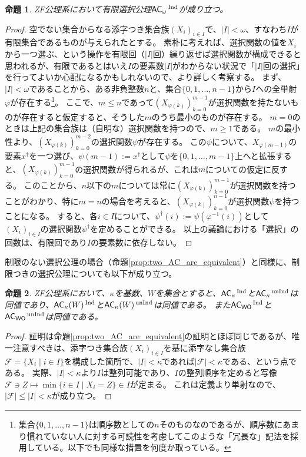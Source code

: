 \documentclass{jarticle}
\newtheorem{proposition}{命題}
\newcommand{\WithIndex}[1]{$\textrm{#1}{}^{\,\textrm{\scriptsize Ind}}$}
\newcommand{\WithoutIndex}[1]{$\textrm{#1}{}^{\,\textrm{\scriptsize unInd}}$}
\begin{document}
\begin{proposition}
\label{prop:finite-AC}
ZF公理系において有限選択公理\WithIndex{$\mathsf{AC}_{\omega}$}が成り立つ。
\end{proposition}
\begin{proof}
空でない集合からなる添字つき集合族$(X_i)_{i \in I}$で、$|I| < \omega$、すなわち$I$が有限集合であるものが与えられたとする。
素朴に考えれば、選択関数の値を$X_i$から一つ選ぶ、という操作を有限回（$|I|$回）繰り返せば選択関数が構成できると思われるが、有限であるとはいえ$I$の要素数$|I|$がわからない状況で「$|I|$回の選択」を行ってよいか心配になるかもしれないので、より詳しく考察する。
まず、$|I| < \omega$であることから、ある非負整数$n$と、集合$\{0,1,\dots,n-1\}$から$I$への全単射$\varphi$が存在する\footnote{集合$\{0,1,\dots,n-1\}$は順序数としての$n$そのものなのであるが、順序数にあまり慣れていない人に対する可読性を考慮してこのような「冗長な」記法を採用している。以下でも同様な措置を何度か取っている。}。
ここで、$m \leq n$であって$(X_{\varphi(k)})_{k=0}^{m-1}$が選択関数を持たないものが存在すると仮定すると、そうした$m$のうち最小のものが存在する。
$m = 0$のときは上記の集合族は（自明な）選択関数を持つので、$m \geq 1$である。
$m$の最小性より、$(X_{\varphi(k)})_{k=0}^{m-2}$の選択関数$\psi$が存在する。
この$\psi$について、$X_{\varphi(m-1)}$の要素$x^{\dagger}$を一つ選び、$\psi(m-1) := x^{\dagger}$として$\psi$を$\{0,1,\dots,m-1\}$上へと拡張すると、$(X_{\varphi(k)})_{k=0}^{m-1}$の選択関数が得られるが、これは$m$についての仮定に反する。
このことから、$n$以下の$m$については常に$(X_{\varphi(k)})_{k=0}^{m-1}$が選択関数を持つことがわかり、特に$m = n$の場合を考えると、$(X_{\varphi(k)})_{k=0}^{n-1}$が選択関数$\psi$を持つことになる。
すると、各$i \in I$について、$\psi^{\dagger}(i) := \psi(\varphi^{-1}(i))$として$(X_i)_{i \in I}$の選択関数$\psi^{\dagger}$を定めることができる。
以上の議論における「選択」の回数は、有限回であり$I$の要素数に依存しない。
\end{proof}

制限のない選択公理の場合（命題\ref{prop:two_AC_are_equivalent}）と同様に、制限つきの選択公理についても以下が成り立つ。

\begin{proposition}
\label{prop:two_ACC_are_equivalent}
ZF公理系において、$\kappa$を基数、$W$を集合とすると、\WithIndex{$\mathsf{AC}_{\kappa}$}と\WithoutIndex{$\mathsf{AC}_{\kappa}$}は同値であり、\WithIndex{$\mathsf{AC}_{\kappa}(W)$}と\WithoutIndex{$\mathsf{AC}_{\kappa}(W)$}は同値である。
また\WithIndex{$\mathsf{AC}_{\mathsf{WO}}$}と\WithoutIndex{$\mathsf{AC}_{\mathsf{WO}}$}は同値である。
\end{proposition}
\begin{proof}
証明は命題\ref{prop:two_AC_are_equivalent}の証明とほぼ同じであるが、唯一注意すべきは、添字つき集合族$(X_i)_{i \in I}$を基に添字なし集合族$\mathcal{F} = \{X_i \mid i \in I\}$を構成した箇所で、$|I| < \kappa$であれば$|\mathcal{F}| < \kappa$である、という点である。
実際、$|I| < \kappa$より$I$は整列可能であり、$I$の整列順序を定めると写像$\mathcal{F} \ni Z \mapsto \min\{i \in I \mid X_i = Z\} \in I$が定まる。
これは定義より単射なので、$|\mathcal{F}| \leq |I| < \kappa$が成り立つ。
\end{proof}
\end{document}
